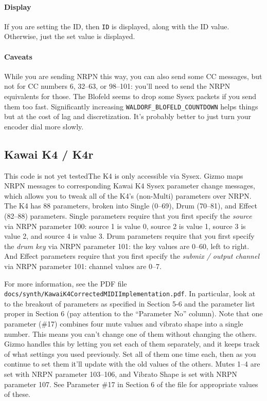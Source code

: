 \documentclass{article}
\begin{document}
\paragraph{Display}  If you are setting the ID, then \texttt{ID} is displayed, along with the ID value.  Otherwise, just the set value is displayed.

\paragraph{Caveats} While you are sending NRPN this way, you can also send some CC messages, but not for CC numbers 6, 32--63, or 98--101: you'll need to send the NRPN equivalents for those.  The Blofeld seems to drop some Sysex packets if you send them too fast.  Significantly increasing \texttt{WALDORF\_BLOFELD\_COUNTDOWN} helps things but at the cost of lag and discretization.  It's probably better to just turn your encoder dial more slowly.

\subsection{Kawai K4 / K4r}  {\color{red} This code is not yet tested}\quad The K4 is only accessible via Sysex.  Gizmo maps NRPN messages to corresponding Kawai K4 Sysex parameter change messages, which allows you to tweak all of the K4's (non-Multi) parameters over NRPN.  The K4 has 88 parameters, broken into Single (0--69), Drum (70--81), and Effect (82--88) parameters.  Single parameters require that you first specify the {\it source} via NRPN parameter 100: source 1 is value 0, source 2 is value 1, source 3 is value 2, and source 4 is value 3.  Drum parameters require that you first specify the {\it drum key} via NRPN parameter 101: the key values are 0--60, left to right.  And Effect parameters require that you first specify the {\it submix / output channel} via NRPN parameter 101: channel values are 0--7.  

For more information, see the PDF file \texttt{docs/synth/KawaiK4CorrectedMIDIImplementation.pdf}.  In particular, look at to the breakout of parameters as specified in Section 5-6 and the parameter list proper in Section 6 (pay attention to the ``Parameter No'' column).   Note that one parameter (\#17) combines four mute values and vibrato shape into a single number.  This means you can't change one of them without changing the others.  Gizmo handles this by letting you set each of them separately, and it keeps track of what settings you used previously.  Set all of them one time each, then as you continue to set them it'll update with the old values of the others.  Mutes 1--4 are set with NRPN parameter 103--106, and Vibrato Shape is set with NRPN parameter 107.  See Parameter \#17 in Section 6 of the file for appropriate values of these.
\end{document}
